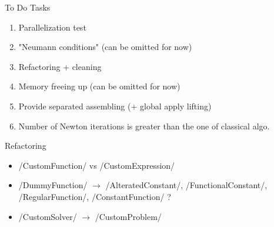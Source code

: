 \documentclass[9pt]{beamer}
\begin{document}
\begin{frame}{To Do}
  Tasks
  \begin{enumerate}
    \item Parallelization test
    \item "Neumann conditions" (can be omitted for now)
    \item Refactoring + cleaning 
    \item Memory freeing up  (can be omitted for now)
    \item Provide separated assembling (+ global apply lifting)
    \item Number of Newton iterations is greater than the one of classical algo.
  \end{enumerate}

  Refactoring
  \begin{itemize}
    \item \mypython/CustomFunction/ vs \mypython/CustomExpression/
    \item \mypython/DummyFunction/ $\rightarrow$ \mypython/AlteratedConstant/, \mypython/FunctionalConstant/, \mypython/RegularFunction/, \mypython/ConstantFunction/ ?
    \item \mypython/CustomSolver/ $\rightarrow$ \mypython/CustomProblem/
  \end{itemize}  

\end{frame}




\end{document}
